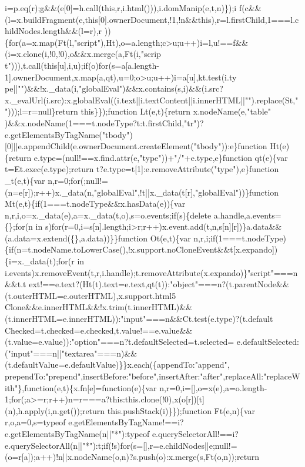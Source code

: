 \begin{DoxyCode}
{       i=p.eq(r);g&&(e[0]=h.call(this,r,i.html())),i.domManip(e,t,n)\});i
      f(c&&(l=x.buildFragment(e,this[0].ownerDocument,!1,!n&&this),r=l.firstChild,1===l.childNodes.length&&(l=r),r
      ))\{for(a=x.map(Ft(l,"script"),Ht),o=a.length;c>u;u++)i=l,u!==f&&(i=x.clone(i,!0,!0),o&&x.merge(a,Ft(i,"scrip
      t"))),t.call(this[u],i,u);if(o)for(s=a[a.length-1].ownerDocument,x.map(a,qt),u=0;o>u;u++)i=a[u],kt.test(i.ty
      pe||"")&&!x.\_data(i,"globalEval")&&x.contains(s,i)&&(i.src?x.\_evalUrl(i.src):x.globalEval((i.text||i.textContent||i.innerHTML||"").replace(St,"")));l=r=null\}return this\}\});function Lt(e,t)\{return
       x.nodeName(e,"table"
      )&&x.nodeName(1===t.nodeType?t:t.firstChild,"tr")?e.getElementsByTagName("tbody")[0]||e.appendChild(e.ownerDocument.createElement("tbody")):e\}function Ht(e)\{return
       e.type=(null!==x.find.attr(e,"type"))+"/"+e.type,e\}function qt(e)\{var t=Et.exec(e.type);return t?e.type=t[1]:e.removeAttribute("type"),e\}function \_t(e,t)\{var
       n,r=0;for(;null!=(n=e[r]);r++)x.\_data(n,"globalEval",!t||x.\_data(t[r],"globalEval"))\}function
       Mt(e,t)\{if(1===t.nodeType&&x.hasData(e))\{var n,r,i,o=x.\_data(e),a=x.\_data(t,o),s=o.events;if(s)\{delete
       a.handle,a.events=\{\};for(n in
       s)for(r=0,i=s[n].length;i>r;r++)x.event.add(t,n,s[n][r])\}a.data&&(a.data=x.extend(\{\},a.data))\}\}function Ot(e,t)\{var
       n,r,i;if(1===t.nodeType)\{if(n=t.nodeName.toLowerCase(),!x.support.noCloneEvent&&t[x.expando])\{i=x.\_data(t);for(r in
       i.events)x.removeEvent(t,r,i.handle);t.removeAttribute(x.expando)\}"script"===n&&t.t
      ext!==e.text?(Ht(t).text=e.text,qt(t)):"object"===n?(t.parentNode&&(t.outerHTML=e.outerHTML),x.support.html5
      Clone&&e.innerHTML&&!x.trim(t.innerHTML)&&(t.innerHTML=e.innerHTML)):"input"===n&&Ct.test(e.type)?(t.default
      Checked=t.checked=e.checked,t.value!==e.value&&(t.value=e.value)):"option"===n?t.defaultSelected=t.selected=
      e.defaultSelected:("input"===n||"textarea"===n)&&(t.defaultValue=e.defaultValue)\}\}x.each(\{appendTo:"append",
      prependTo:"prepend",insertBefore:"before",insertAfter:"after",replaceAll:"replaceWith"\},function(e,t)\{x.fn[e]=function(e)\{var
       n,r=0,i=[],o=x(e),a=o.length-1;for(;a>=r;r++)n=r===a?this:this.clone(!0),x(o[r])[t](n),h.apply(i,n.get());return this.pushStack(i)\}\});function Ft(e,n)\{var r,o,a=0,s=typeof
       e.getElementsByTagName!==i?e.getElementsByTagName(n||"*"):typeof
       e.querySelectorAll!==i?e.querySelectorAll(n||"*"):t;if(!s)for(s=[],r=e.childNodes||e;null!=(o=r[a]);a++)!n||x.nodeName(o,n)?s.push(o):x.merge(s,Ft(o,n));return
}
\end{DoxyCode}
